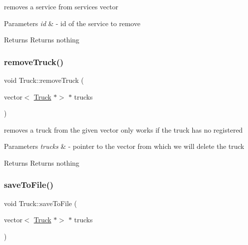 removes a service from services vector 


\begin{DoxyParams}{Parameters}
{\em id} & -\/ id of the service to remove \\
\hline
\end{DoxyParams}
\begin{DoxyReturn}{Returns}
Returns nothing 
\end{DoxyReturn}
\mbox{\label{class_truck_acb3e375dfa4ba812de7e65f0b3e37ded}} 
\subsubsection{\texorpdfstring{remove\+Truck()}{removeTruck()}}
{\footnotesize\ttfamily void Truck\+::remove\+Truck (\begin{DoxyParamCaption}\item[{vector$<$ \hyperlink{class_truck}{Truck} $\ast$$>$ $\ast$}]{trucks }\end{DoxyParamCaption})\hspace{0.3cm}{\ttfamily [static]}}



removes a truck from the given vector only works if the truck has no registered 


\begin{DoxyParams}{Parameters}
{\em trucks} & -\/ pointer to the vector from which we will delete the truck \\
\hline
\end{DoxyParams}
\begin{DoxyReturn}{Returns}
Returns nothing 
\end{DoxyReturn}
\mbox{\label{class_truck_ad03e7d588f7f6dc24e1423e2e481ad3a}} 
\subsubsection{\texorpdfstring{save\+To\+File()}{saveToFile()}}
{\footnotesize\ttfamily void Truck\+::save\+To\+File (\begin{DoxyParamCaption}\item[{vector$<$ \hyperlink{class_truck}{Truck} $\ast$$>$ $\ast$}]{trucks }\end{DoxyParamCaption})\hspace{0.3cm}{\ttfamily [static]}}



